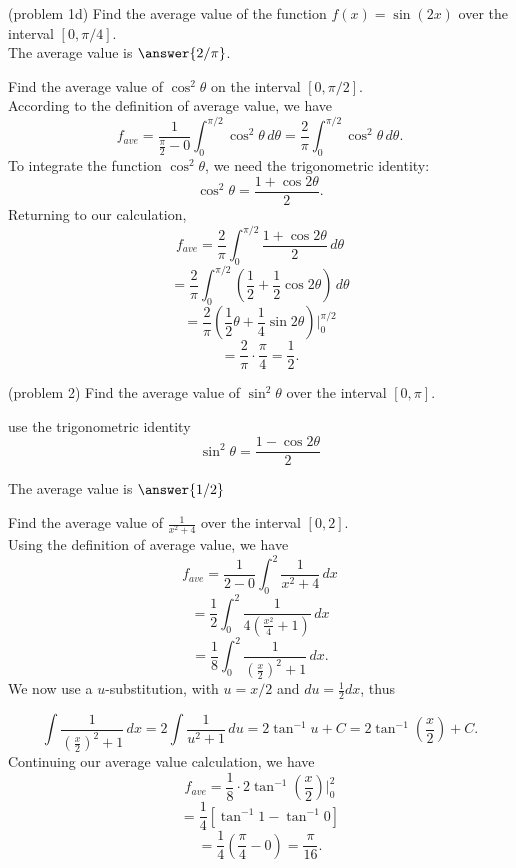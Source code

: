 \documentclass[handout]{ximera}
\begin{document}
\begin{problem}(problem 1d)
Find the average value of the function $f(x) = \sin(2x)$ over the interval $[0, \pi/4]$.\\
The average value is $\answer{2/\pi}$.
\end{problem}



\begin{example}[example 2] Find the average value of $\cos^2\theta$ on the interval $[0, \pi/2]$.\\
According to the definition of average value, we have
\[
f_{ave} = \frac{1}{\frac{\pi}{2} - 0} \int_0^{\pi/2} \cos^2 \theta \, d\theta = \frac{2}{\pi} \int_0^{\pi/2} \cos^2 \theta \, d\theta.
\]
To integrate the function $\cos^2 \theta$, we need the trigonometric identity:
\[
\cos^2 \theta = \frac{1 + \cos 2\theta}{2}.
\]
Returning to our calculation,
\[
f_{ave} = \frac{2}{\pi} \int_0^{\pi/2} \frac{1 + \cos 2\theta}{2} \, d\theta
\]
\[
 = \frac{2}{\pi} \int_0^{\pi/2} \left(\frac12 + \frac12\cos 2\theta\right) \, d\theta
\]
\[
= \frac{2}{\pi} \left(\frac12 \theta + \frac14 \sin 2\theta \right) \bigg|_0^{\pi/2}
\]
\[
=\frac{2}{\pi} \cdot \frac{\pi}{4} = \frac12.
\]


\end{example}



\begin{problem}(problem 2)
Find the average value of $\sin^2 \theta$ over the interval $[0, \pi]$.\\

    \begin{hint}
      use the trigonometric identity $$\sin^2 \theta = \frac{1 - \cos 2\theta}{2}$$
    \end{hint}
    
		
The average value is $\answer{1/2}$
\end{problem}

\begin{example}[example 3]
Find the average value of $\displaystyle{\frac{1}{x^2 + 4}}$ over the interval $[0, 2]$.\\
Using the definition of average value, we have
\[
f_{ave} = \frac{1}{2-0} \int_0^2 \frac{1}{x^2 + 4} \, dx
\]
\[
= \frac12 \int_0^2 \frac{1}{4\left(\frac{x^2}{4} + 1\right)} \, dx
\]
\[
= \frac18 \int_0^2 \frac{1}{\left(\frac{x}{2}\right)^2 + 1} \, dx.
\]
We now use a $u$-substitution, with $u = x/2$ and $du = \frac12 dx$, thus

\[
\int \frac{1}{\left(\frac{x}{2}\right)^2 + 1} \, dx = 2\int\frac{1}{u^2 + 1} \, du = 2\tan^{-1} u + C = 2\tan^{-1}\left(\frac{x}{2}\right) + C.
\]
Continuing our average value calculation, we have
\[
f_{ave} = \frac18 \cdot 2\tan^{-1}\left(\frac{x}{2}\right) \bigg|_0^2
\]
\[
= \frac14 \left[\tan^{-1} 1 - \tan^{-1} 0\right]
\]
\[
= \frac14 \left(\frac{\pi}{4} - 0\right) = \frac{\pi}{16}.
\]



\end{example}
\end{document}
